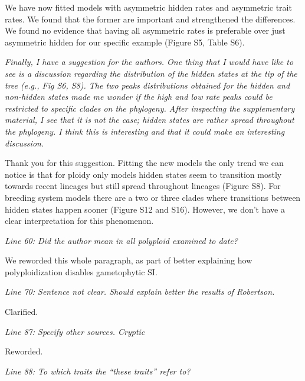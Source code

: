 \documentclass[11pt]{article}
\renewenvironment{quote}{\bigskip\noindent\itshape\ignorespaces}{\smallskip}
\begin{document}
We have now fitted models with asymmetric hidden rates and asymmetric trait rates. We found that the former are important and strengthened the differences. We found no evidence that having all asymmetric rates is preferable over just asymmetric hidden for our specific example (Figure S5, Table S6). 


\begin{quote}
Finally, I have a suggestion for the authors.
One thing that I would have like to see is a discussion regarding the distribution of the hidden states at the tip of the tree (e.g., Fig S6, S8).
The two peaks distributions obtained for the hidden and non-hidden states made me wonder if the high and low rate peaks could be restricted to specific clades on the phylogeny.
After inspecting the supplementary material, I see that it is not the case; hidden states are rather spread throughout the phylogeny.
I think this is interesting and that it could make an interesting discussion.
\end{quote}

Thank you for this suggestion. Fitting the new models the only trend we can notice is that for ploidy only models hidden states seem to transition mostly towards recent lineages but still spread throughout lineages (Figure S8). For breeding system models there are a two or three clades where transitions between hidden states happen sooner (Figure S12 and S16). However, we don't have a clear interpretation for this phenomenon.



\begin{quote}
Line 60: Did the author mean in all polyploid examined to date?
\end{quote}

We reworded this whole paragraph, as part of better explaining how polyploidization disables gametophytic SI.


\begin{quote}
Line 70: Sentence not clear. Should explain better the results of Robertson.
\end{quote}

Clarified.


\begin{quote}
Line 87: Specify other sources. Cryptic
\end{quote}

Reworded.


\begin{quote}
Line 88: To which traits the ``these traits'' refer to?
\end{quote}
\end{document}
